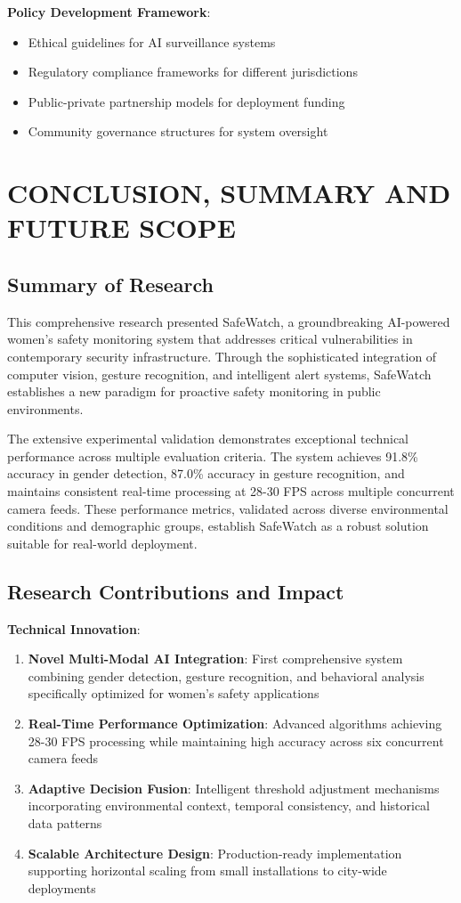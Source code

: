 \documentclass[12pt,a4paper]{article}
\begin{document}
\textbf{Policy Development Framework}:
\begin{itemize}
    \item Ethical guidelines for AI surveillance systems
    \item Regulatory compliance frameworks for different jurisdictions
    \item Public-private partnership models for deployment funding
    \item Community governance structures for system oversight
\end{itemize}

\newpage
\section{CONCLUSION, SUMMARY AND FUTURE SCOPE}

\subsection{Summary of Research}

This comprehensive research presented SafeWatch, a groundbreaking AI-powered women's safety monitoring system that addresses critical vulnerabilities in contemporary security infrastructure. Through the sophisticated integration of computer vision, gesture recognition, and intelligent alert systems, SafeWatch establishes a new paradigm for proactive safety monitoring in public environments.

The extensive experimental validation demonstrates exceptional technical performance across multiple evaluation criteria. The system achieves 91.8\% accuracy in gender detection, 87.0\% accuracy in gesture recognition, and maintains consistent real-time processing at 28-30 FPS across multiple concurrent camera feeds. These performance metrics, validated across diverse environmental conditions and demographic groups, establish SafeWatch as a robust solution suitable for real-world deployment.

\subsection{Research Contributions and Impact}

\textbf{Technical Innovation}:
\begin{enumerate}
    \item \textbf{Novel Multi-Modal AI Integration}: First comprehensive system combining gender detection, gesture recognition, and behavioral analysis specifically optimized for women's safety applications
    \item \textbf{Real-Time Performance Optimization}: Advanced algorithms achieving 28-30 FPS processing while maintaining high accuracy across six concurrent camera feeds
    \item \textbf{Adaptive Decision Fusion}: Intelligent threshold adjustment mechanisms incorporating environmental context, temporal consistency, and historical data patterns
    \item \textbf{Scalable Architecture Design}: Production-ready implementation supporting horizontal scaling from small installations to city-wide deployments
\end{enumerate}
\end{document}
